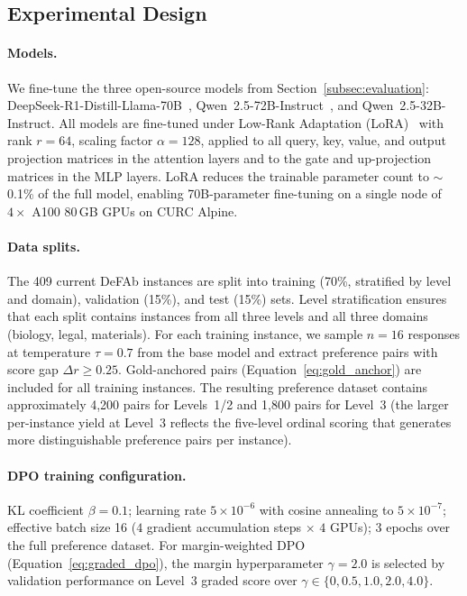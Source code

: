 \documentclass{article}
\theoremstyle{definition}
\begin{document}
\subsection{Experimental Design}\label{subsec:ft_setup}

\paragraph{Models.} We fine-tune the three open-source models from Section~\ref{subsec:evaluation}: DeepSeek-R1-Distill-Llama-70B~\cite{deepseek2025r1}, Qwen~2.5-72B-Instruct~\cite{qwen2024qwen25}, and Qwen~2.5-32B-Instruct. All models are fine-tuned under Low-Rank Adaptation (LoRA)~\cite{hu2022lora} with rank $r = 64$, scaling factor $\alpha = 128$, applied to all query, key, value, and output projection matrices in the attention layers and to the gate and up-projection matrices in the MLP layers. LoRA reduces the trainable parameter count to $\sim$0.1\% of the full model, enabling 70B-parameter fine-tuning on a single node of $4 \times$ A100 80\,GB GPUs on CURC Alpine.

\paragraph{Data splits.} The 409 current DeFAb instances are split into training (70\%, stratified by level and domain), validation (15\%), and test (15\%) sets. Level stratification ensures that each split contains instances from all three levels and all three domains (biology, legal, materials). For each training instance, we sample $n = 16$ responses at temperature $\tau = 0.7$ from the base model and extract preference pairs with score gap $\Delta r \geq 0.25$. Gold-anchored pairs (Equation~\ref{eq:gold_anchor}) are included for all training instances. The resulting preference dataset contains approximately 4,200 pairs for Levels~1/2 and 1,800 pairs for Level~3 (the larger per-instance yield at Level~3 reflects the five-level ordinal scoring that generates more distinguishable preference pairs per instance).

\paragraph{DPO training configuration.} KL coefficient $\beta = 0.1$; learning rate $5 \times 10^{-6}$ with cosine annealing to $5 \times 10^{-7}$; effective batch size 16 ($4$ gradient accumulation steps $\times$ $4$ GPUs); 3 epochs over the full preference dataset. For margin-weighted DPO (Equation~\ref{eq:graded_dpo}), the margin hyperparameter $\gamma = 2.0$ is selected by validation performance on Level~3 graded score over $\gamma \in \{0, 0.5, 1.0, 2.0, 4.0\}$.
\end{document}

